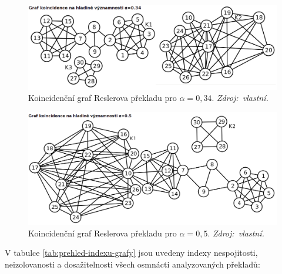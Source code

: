 \documentclass[dp.tex]{subfiles}
\begin{document}
\begin{figure}[H]
	\centering
	\includegraphics[max width=\textwidth,keepaspectratio=true]{imgs-70-prakticka/denotation-resler-034}
	\caption[Koincidenční graf Reslerova překladu pro $\alpha = 0{,}34$.]{Koincidenční graf Reslerova překladu pro $\alpha = 0{,}34$. \textit{Zdroj:~vlastní.}}
	\label{fig:denotation-resler-034}
\end{figure}

\begin{figure}[H]
	\centering
	\includegraphics[max width=\textwidth,keepaspectratio=true]{imgs-70-prakticka/denotation-resler-05}
	\caption[Koincidenční graf Reslerova překladu pro $\alpha = 0{,}5$.]{Koincidenční graf Reslerova překladu pro $\alpha = 0{,}5$. \textit{Zdroj:~vlastní.}}
	\label{fig:denotation-resler-007}
\end{figure}

V tabulce \ref{tab:prehled-indexu-grafy} jsou uvedeny indexy nespojitosti, neizolovanosti a dosažitelnosti všech osmnácti analyzovaných překladů:
\end{document}
